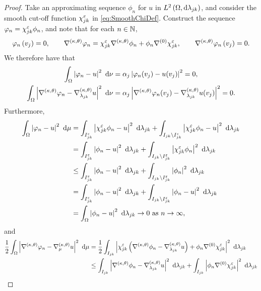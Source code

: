 \begin{proof}
	Take an approximating sequence $\phi_n$ for $u$ in $L^{2}\left( \Omega,\mathrm{d} \lambda_{jk} \right)$, and consider the smooth cut-off function $\chi_{jk}^{\varepsilon}$ in \eqref{eq:SmoothChiDef}.
	Construct the sequence $\varphi_n = \chi_{jk}^{\varepsilon}\phi_n$, and note that for each $n\in\mathbb{N}$, 
	\begin{align*}
		\varphi_n\left( v_j \right)=0, \qquad
		\nabla^{\left( \kappa, \theta \right)}\varphi_n = \chi_{jk}^{\varepsilon}\nabla^{\left( \kappa, \theta \right)}\phi_n + \phi_n\nabla^{(0)}\chi_{jk}^{\varepsilon}, \qquad
		\nabla^{\left( \kappa, \theta \right)}\varphi_n\left( v_j \right) = 0.
	\end{align*}
	We therefore have that
	\begin{align*}
		\int_{\Omega} \left\lvert \varphi_n - u \right\rvert^2  \ \mathrm{d}\nu &= \alpha_j\left\lvert \varphi_n(v_j) - u(v_j) \right\rvert^2 = 0, \\
		\int_{\Omega} \left\lvert \nabla^{\left( \kappa, \theta \right)}\varphi_n - \nabla^{\left( \kappa, \theta \right)}_{\lambda_{jk}}u \right\rvert^2  \ \mathrm{d}\nu &= \alpha_j \left\lvert \nabla^{\left( \kappa, \theta \right)}\varphi_n(v_j) - \nabla^{\left( \kappa, \theta \right)}_{\lambda_{jk}}u(v_j) \right\rvert^2 = 0.
	\end{align*}
	Furthermore, 
	\begin{align*}
		\int_{\Omega} \left\lvert \varphi_n - u \right\rvert^2  \ \mathrm{d}\mu 
		&= \int_{I_{jk}^\varepsilon} \left\lvert \chi_{jk}^\varepsilon\phi_n - u \right\rvert^2  \ \mathrm{d}\lambda_{jk} + \int_{I_{jk}\setminus I_{jk}^\varepsilon} \left\lvert \chi_{jk}^\varepsilon\phi_n - u \right\rvert^2  \ \mathrm{d}\lambda_{jk} \\
		&= \int_{I_{jk}^\varepsilon} \left\lvert \phi_n - u \right\rvert^2  \ \mathrm{d}\lambda_{jk} + \int_{I_{jk}\setminus I_{jk}^\varepsilon} \left\lvert \chi_{jk}^\varepsilon\phi_n \right\rvert^2  \ \mathrm{d}\lambda_{jk} \\
		&\leq \int_{I_{jk}^\varepsilon} \left\lvert \phi_n - u \right\rvert^2  \ \mathrm{d}\lambda_{jk} + \int_{I_{jk}\setminus I_{jk}^\varepsilon} \left\lvert \phi_n \right\rvert^2  \ \mathrm{d}\lambda_{jk} \\
		&= \int_{I_{jk}^\varepsilon} \left\lvert \phi_n - u \right\rvert^2  \ \mathrm{d}\lambda_{jk} + \int_{I_{jk}\setminus I_{jk}^\varepsilon} \left\lvert \phi_n - u \right\rvert^2  \ \mathrm{d}\lambda_{jk} \\
		&= \int_{\Omega} \left\lvert \phi_n - u \right\rvert^2  \ \mathrm{d}\lambda_{jk} \rightarrow 0 \ \text{as} \ n \rightarrow\infty,
	\end{align*}
	and
	\begin{align*}
		\recip{2}\integral{\ddom}{ \abs{\ktgrad\varphi_n - \ktgrad_{\ddmes}u}^2 }{\ddmes}
		&= \recip{2}\integral{I_{jk}}{ \abs{\chi_{jk}^\eps\bracs{\ktgrad\phi_n - \ktgrad_{\lambda_{jk}}u} + \phi_n\ograd\chi_{jk}^\eps}^2 }{\lambda_{jk}} \\
		&\leq \integral{I_{jk}}{ \abs{\ktgrad\phi_n - \ktgrad_{\lambda_{jk}}u}^2 }{\lambda_{jk}}
		+ \integral{I_{jk}}{ \abs{\phi_n\ograd\chi_{jk}^\eps}^2 }{\lambda_{jk}} \\

\end{align*}
\end{proof}

